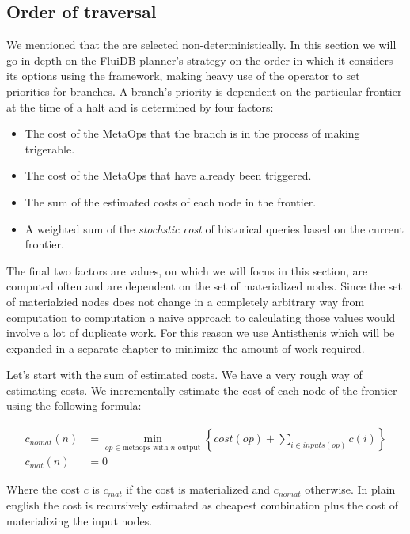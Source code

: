 \subsection{Order of traversal}

We mentioned that the  are selected non-deterministically. In
this section we will go in depth on the FluiDB planner's strategy on
the order in which it considers its options using the 
framework, making heavy use of the  operator to set priorities
for branches. A branch's priority is dependent on the particular
frontier at the time of a halt and is determined by four factors:

\begin{itemize}
\item The cost of the MetaOps that the branch is in the process of making
trigerable.
\item The cost of the MetaOps that have already been triggered.
\item The sum of the estimated costs of each node in the frontier.
\item A weighted sum of the \emph{stochstic cost} of historical queries based
on the current frontier.
\end{itemize}

The final two factors are values, on which we will focus in this
section, are computed often and are dependent on the set of
materialized nodes. Since the set of materialzied nodes does not
change in a completely arbitrary way from computation to computation a
naive approach to calculating those values would involve a lot of
duplicate work. For this reason we use Antisthenis which will be
expanded in a separate chapter to minimize the amount of work
required.

Let's start with the sum of estimated costs. We have a very rough way
of estimating costs. We incrementally estimate the cost of each node
of the frontier using the following formula:

\begin{align}
  c_{nomat}(n) &=
    \min\limits_{op \in \text{metaops with \(n\) output}} \left\{ cost(op) + \sum\limits_{i \in inputs(op)} c(i)  \right\} \\
  c_{mat}(n) &= 0
\end{align}

Where the cost \(c\) is \(c_{mat}\) if the cost is materialized and
\(c_{nomat}\) otherwise. In plain english the cost is recursively
estimated as cheapest combination  plus the cost of
materializing the input nodes.

